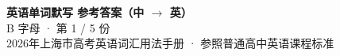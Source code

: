 \documentclass[10pt,a4paper]{article}
\begin{document}
\pagestyle{plain}

\begin{center}
{\LARGE\bfseries 英语单词默写 \quad 参考答案（中 $\to$ 英）}\\[0.22em]
{\large B 字母 · 第 1 / 5 份}\\[0.18em]
{\small 2026年上海市高考英语词汇用法手册 · 参照普通高中英语课程标准}
\end{center}

\vspace{0.2em}
\noindent{\color{rulegray}\rule{\textwidth}{0.8pt}}

\vspace{0.35em}

\vspace{0.25em}
\renewcommand{\arraystretch}{1.32}
\end{document}

